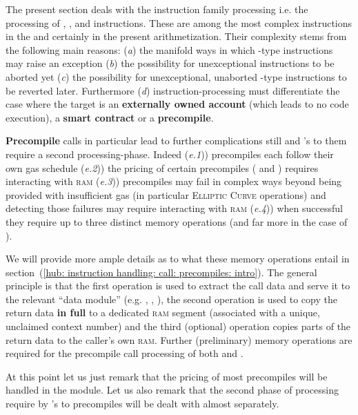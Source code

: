 The present section deals with the  instruction family processing i.e. the processing of
, ,  and  instructions.
These are among the most complex instructions in the \evm{} and certainly in the present arithmetization.
Their complexity stems from the following main reasons:
(\emph{a}) the manifold ways in which -type instructions may raise an exception
(\emph{b}) the possibility for unexceptional instructions to be aborted yet
(\emph{c}) the possibility for unexceptional, unaborted -type instructions to be reverted later.
Furthermore
(\emph{d}) instruction-processing must differentiate the case where the target is an \textbf{externally owned account} (which leads to no code execution), a \textbf{smart contract} or a \textbf{precompile}.

\textbf{Precompile} calls in particular lead to further complications still and 's to them require a second processing-phase.
Indeed
(\emph{e.1})) precompiles each follow their own gas schedule
(\emph{e.2})) the pricing of certain precompiles (\instModexp{} and \instBlake{}) requires interacting with \textsc{ram}
(\emph{e.3})) precompiles may fail in complex ways beyond being provided with insufficient gas (in particular \textsc{Elliptic Curve} operations) and detecting those failures may require interacting with \textsc{ram}
(\emph{e.4})) when successful they require up to three distinct memory operations (and far more in the case of \instModexp{}).

We will provide more ample details as to what these memory operations entail in section~(\ref{hub: instruction handling: call: precompiles: intro}).
The general principle is that
the first operation is used to extract the call data and serve it to the relevant ``data module'' (e.g. \shakiraMod{}, \ecDataMod{}, \blkMdxMod{}),
the second operation is used to copy the return data \textbf{in full} to a dedicated \textsc{ram} segment (associated with a unique, unclaimed context number) and
the third (optional) operation copies parts of the return data to the caller's own \textsc{ram}.
Further (preliminary) memory operations are required for the precompile call processing of both \instModexp{} and \instBlake{}.

At this point let us just remark that the pricing of most precompiles will be handled in the \oobMod{} module. Let us also remark that the second phase of processing require by 's to precompiles will be dealt with almost separately. 
